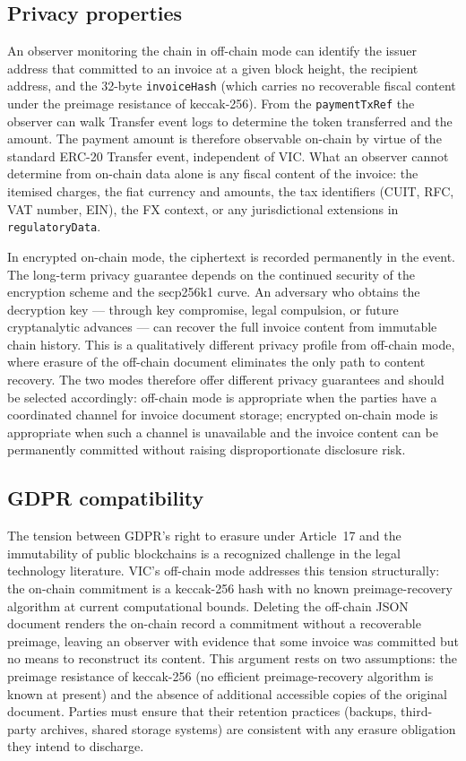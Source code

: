 \documentclass[11pt,a4paper]{article}
\begin{document}
\subsection{Privacy properties}

An observer monitoring the chain in off-chain mode can identify the issuer address that committed to an invoice at a given block height, the recipient address, and the 32-byte \texttt{invoiceHash} (which carries no recoverable fiscal content under the preimage resistance of keccak-256). From the \texttt{paymentTxRef} the observer can walk Transfer event logs to determine the token transferred and the amount. The payment amount is therefore observable on-chain by virtue of the standard ERC-20 Transfer event, independent of VIC. What an observer cannot determine from on-chain data alone is any fiscal content of the invoice: the itemised charges, the fiat currency and amounts, the tax identifiers (CUIT, RFC, VAT number, EIN), the FX context, or any jurisdictional extensions in \texttt{regulatoryData}.

In encrypted on-chain mode, the ciphertext is recorded permanently in the event. The long-term privacy guarantee depends on the continued security of the encryption scheme and the secp256k1 curve. An adversary who obtains the decryption key --- through key compromise, legal compulsion, or future cryptanalytic advances --- can recover the full invoice content from immutable chain history. This is a qualitatively different privacy profile from off-chain mode, where erasure of the off-chain document eliminates the only path to content recovery. The two modes therefore offer different privacy guarantees and should be selected accordingly: off-chain mode is appropriate when the parties have a coordinated channel for invoice document storage; encrypted on-chain mode is appropriate when such a channel is unavailable and the invoice content can be permanently committed without raising disproportionate disclosure risk.

\subsection{GDPR compatibility}

The tension between GDPR's right to erasure under Article~17 and the immutability of public blockchains is a recognized challenge in the legal technology literature. VIC's off-chain mode addresses this tension structurally: the on-chain commitment is a keccak-256 hash with no known preimage-recovery algorithm at current computational bounds. Deleting the off-chain JSON document renders the on-chain record a commitment without a recoverable preimage, leaving an observer with evidence that some invoice was committed but no means to reconstruct its content. This argument rests on two assumptions: the preimage resistance of keccak-256 (no efficient preimage-recovery algorithm is known at present) and the absence of additional accessible copies of the original document. Parties must ensure that their retention practices (backups, third-party archives, shared storage systems) are consistent with any erasure obligation they intend to discharge.
\end{document}
